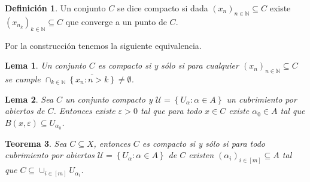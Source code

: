 \documentclass[12pt]{article}
\theoremstyle{plain}
\newtheorem{Th}{Teorema}[subsection]   %
\newtheorem{Lem}[Th]{Lema}             %
\theoremstyle{definition}
\newtheorem*{nonum-Def}{Definición}    %
\theoremstyle{remark}
\numberwithin{equation}{section}
\newcommand{\bN}{\mathbb{N}}        %
\newcommand{\cU}{\mathcal{U}}       %
\renewcommand{\:}{\colon}           %
\newcommand{\conj}[1]{\left\lbrace#1\right\rbrace}
\newcommand{\bonj}[1]{\left\lbrack#1\right\rbrack}
\begin{document}
\begin{multicols}{2}
\begin{nonum-Def}
  Un conjunto $C$ se dice compacto si dada $(x_n)_{n\in\bN}\subseteq C$ existe $(x_{n_k})_{k\in\bN}\subseteq C$ que converge a un punto de $C$.
\end{nonum-Def}
Por la construcción tenemos la siguiente equivalencia.

\begin{Lem}
  Un conjunto $C$ es compacto si y sólo si para cualquier $(x_n)_{n\in\bN}\subseteq C$ se cumple $\cap_{k\in\bN}\overline{\conj{x_n\colon n>k}}\neq\emptyset$.
\end{Lem}

\begin{Lem}
  Sea $C$ un conjunto compacto y $\cU=\conj{U_\alpha\colon\alpha\in A}$ un cubrimiento por abiertos de $C$. Entonces existe $\varepsilon>0$ tal que para todo $x\in C$ existe $\alpha_0\in A$ tal que $B(x,\varepsilon)\subseteq U_{\alpha_0}$.
\end{Lem}


\begin{Th}\label{thm:BolzWeirIffCubrimientos}
  Sea $C\subseteq X$, entonces $C$ es compacto si y sólo si para todo cubrimiento por abiertos $\cU=\conj{U_\alpha\colon \alpha\in A}$ de $C$ existen $(\alpha_i)_{i\in\bonj{m}}\subseteq A$ tal que $C\subseteq\cup_{i\in\bonj{m}}U_{\alpha_i}$.
\end{Th}


\end{multicols}
\end{document}
